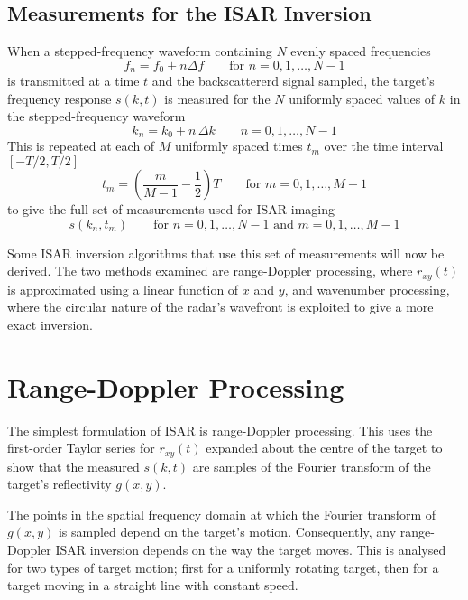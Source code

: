 \subsection{Measurements for the ISAR Inversion}

When a stepped-frequency waveform containing $N$ evenly spaced frequencies
\begin{equation}
f_n=f_0+n\Delta f\qquad\mbox{for $n=0,1,\ldots,N-1$}
\end{equation}
is transmitted at a time $t$ and the backscattererd signal sampled, the 
target's frequency response $s(k,t)$ is measured for the $N$ uniformly spaced 
values of $k$ in the stepped-frequency waveform
\begin{equation}
k_n=k_0+n\,\Delta k\qquad n=0,1,\ldots, N-1
\end{equation}
This is repeated at each of $M$ uniformly spaced times $t_m$ over the time 
interval $[-T/2,T/2]$ 
\begin{equation}
t_m=\left(\frac{m}{M-1}-\frac{1}{2}\right)T\qquad\mbox{for $m=0,1,\ldots,
M-1$}
\end{equation}
to give the full set of measurements used for ISAR imaging
\begin{equation}
s(k_n,t_m)\qquad\mbox{for $n=0,1,\ldots,N-1$ and $m=0,1,\ldots,M-1$}
\end{equation}

Some ISAR inversion algorithms that use this set of measurements will now be
derived.  The two methods examined are range-Doppler processing, where
$r_{xy}(t)$ is approximated using a linear function of $x$ and $y$, and
wavenumber processing, where the circular nature of the radar's wavefront is
exploited to give a more exact inversion.


\section{Range-Doppler Processing}
\label{ii sec:rdp}

The simplest formulation of ISAR is range-Doppler processing.  This uses the
first-order Taylor series for $r_{xy}(t)$ expanded about the centre of the
target  to show that the measured $s(k,t)$ are samples of the Fourier
transform of the target's reflectivity $g(x,y)$.  

The points in the spatial frequency domain at which the Fourier transform of
$g(x,y)$ is sampled depend on the target's motion.  Consequently, any
range-Doppler ISAR inversion depends on the way the target moves.  This is
analysed for two types of target motion; first for a uniformly rotating
target, then for a target moving in a straight line with constant speed.

